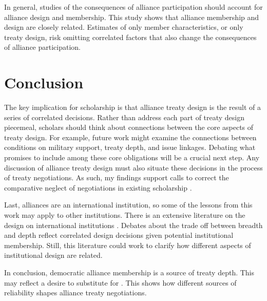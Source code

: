 \documentclass[12pt]{article}
\begin{document}
In general, studies of the consequences of alliance participation should account for alliance design and membership. 
This study shows that alliance membership and design are closely related. 
Estimates of only member characteristics, or only treaty design, risk omitting correlated factors that also change the consequences of alliance participation. 


\section{Conclusion}



The key implication for scholarship is that alliance treaty design is the result of a series of correlated decisions. 
Rather than address each part of treaty design piecemeal, scholars should think about connections between the core aspects of treaty design. 
For example, future work might examine the connections between conditions on military support, treaty depth, and issue linkages.  
Debating what promises to include among these core obligations will be a crucial next step. 
Any discussion of alliance treaty design must also situate these decisions in the process of treaty negotiations.
As such, my findings support calls to correct the comparative neglect of negotiations in existing scholarship \citep{Poast2019a}. 


Last, alliances are an international institution, so some of the lessons from this work may apply to other institutions. 
There is an extensive literature on the design on international institutions \citep{DownesRocke1995, MartinSimmons1998, Koremenosetal2001, Koremenos2005, Thompson2010}.
Debates about the trade off between breadth and depth \citep{Downsetal1998, Gilligan2004} reflect correlated design decisions given potential institutional membership. 
Still, this literature could work to clarify how different aspects of institutional design are related. 


In conclusion, democratic alliance membership is a source of treaty depth. 
This may reflect a desire to substitute for . 
This shows how different sources of reliability shapes alliance treaty negotiations. 



\singlespace
 
 
\end{document}
